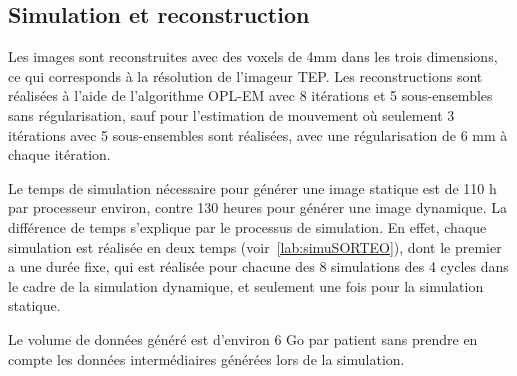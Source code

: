 \subsection{Simulation et reconstruction}

Les images sont reconstruites avec des voxels de 4mm dans les trois dimensions, ce qui corresponds à la résolution de l'imageur TEP. Les reconstructions sont réalisées à l'aide de l'algorithme OPL-EM avec 8 itérations et 5 sous-ensembles sans régularisation, sauf pour l'estimation de mouvement où seulement 3 itérations avec 5 sous-ensembles sont réalisées, avec une régularisation de 6 mm à chaque itération. 

Le temps de simulation nécessaire pour générer une image statique est de 110 h par processeur environ, contre 130 heures pour générer une image dynamique. La différence de temps s'explique par le processus de simulation. En effet, chaque simulation est réalisée en deux temps (voir~\ref{lab:simuSORTEO}), dont le premier a une durée fixe, qui est réalisée pour chacune des 8 simulations des 4 cycles dans le cadre de la simulation dynamique, et seulement une fois pour la simulation statique.

Le volume de données généré est d'environ 6 Go par patient sans prendre en compte les données intermédiaires générées lors de la simulation.

